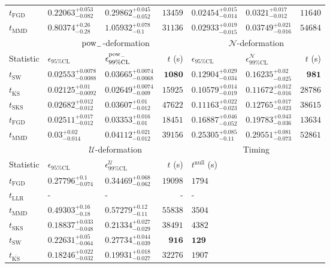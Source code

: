 \begin{tabular}{l|llr|llr}
	$t_{\mathrm{FGD}}$ & ${\mathbf{0.22063_{-0.082}^{+0.053}}}$ & ${\mathbf{0.29862_{-0.052}^{+0.045}}}$ & $13459$ & $0.02454_{-0.014}^{+0.015}$ & $0.0321_{-0.012}^{+0.017}$ & $11640$ \\
	$t_{\mathrm{MMD}}$ & $0.80374_{-0.28}^{+0.26}$ & $1.05932_{-0.1}^{+0.078}$ & $31136$ & $0.02933_{-0.015}^{+0.019}$ & $0.03749_{-0.016}^{+0.021}$ & $54684$ \\
	\toprule
	\multicolumn{1}{c}{} & \multicolumn{3}{c}{$\rm{pow}_{-}$-deformation} & \multicolumn{3}{c}{$\mathcal{N}$-deformation} \\
	Statistic & $\epsilon_{95\%\mathrm{CL}}$ & $\epsilon^  {\rm{pow}_{-}}_{99\%\mathrm{CL}}$ & $t$ (s) & $\epsilon_{95\%\mathrm{CL}}$ & $\epsilon^    {\mathcal{N}}_{99\%\mathrm{CL}}$ & $t$ (s) \\
	\midrule
	$t_{\mathrm{SW}}$ & $0.02553_{-0.0088}^{+0.0078}$ & $0.03665_{-0.0068}^{+0.0074}$ & ${\mathbf{1080}}$ & $0.12904_{-0.034}^{+0.029}$ & $0.16235_{-0.025}^{+0.02}$ & ${\mathbf{981}}$ \\
	$t_{\overline{\mathrm{KS}}}$ & ${\mathbf{0.02125_{-0.0092}^{+0.01}}}$ & ${\mathbf{0.02649_{-0.009}^{+0.0074}}}$ & $15925$ & ${\mathbf{0.10579_{-0.019}^{+0.014}}}$ & ${\mathbf{0.11672_{-0.016}^{+0.012}}}$ & $28786$ \\
	$t_{\mathrm{SKS}}$ & $0.02682_{-0.012}^{+0.012}$ & $0.03607_{-0.012}^{+0.01}$ & $47622$ & $0.11163_{-0.023}^{+0.022}$ & $0.12765_{-0.023}^{+0.017}$ & $38615$ \\
	$t_{\mathrm{FGD}}$ & $0.02511_{-0.012}^{+0.017}$ & $0.03353_{-0.01}^{+0.016}$ & $18451$ & $0.16887_{-0.052}^{+0.046}$ & $0.19783_{-0.036}^{+0.043}$ & $13634$ \\
	$t_{\mathrm{MMD}}$ & $0.03_{-0.014}^{+0.02}$ & $0.04112_{-0.012}^{+0.021}$ & $39156$ & $0.25305_{-0.11}^{+0.085}$ & $0.29551_{-0.073}^{+0.081}$ & $52861$ \\
	\toprule
	\multicolumn{1}{c}{} & \multicolumn{3}{c}{$\mathcal{U}$-deformation} & \multicolumn{3}{c}{Timing} \\
	Statistic & $\epsilon_{95\%\mathrm{CL}}$ & $\epsilon^    {\mathcal{U}}_{99\%\mathrm{CL}}$ & $t$ (s) & $t^{\mathrm{null}}$ (s) \\
	\midrule
	$t_{\mathrm{FGD}}$ & $0.27796_{-0.074}^{+0.1}$ & $0.34469_{-0.062}^{+0.068}$ & $19098$ & $1794$ \\
	$t_{\mathrm{LLR}}$ & - & - & - & - \\
	$t_{\mathrm{MMD}}$ & $0.49303_{-0.18}^{+0.16}$ & $0.57279_{-0.11}^{+0.12}$ & $55838$ & $3504$ \\
	$t_{\mathrm{SKS}}$ & $0.18837_{-0.048}^{+0.033}$ & $0.21334_{-0.029}^{+0.027}$ & $38491$ & $4382$ \\
	$t_{\mathrm{SW}}$ & $0.22631_{-0.064}^{+0.05}$ & $0.27734_{-0.039}^{+0.044}$ & ${\mathbf{916}}$ & ${\mathbf{129}}$ \\
	$t_{\overline{\mathrm{KS}}}$ & ${\mathbf{0.18246_{-0.032}^{+0.022}}}$ & ${\mathbf{0.19931_{-0.027}^{+0.018}}}$ & $32276$ & $1907$ \\
	\bottomrule
\end{tabular}